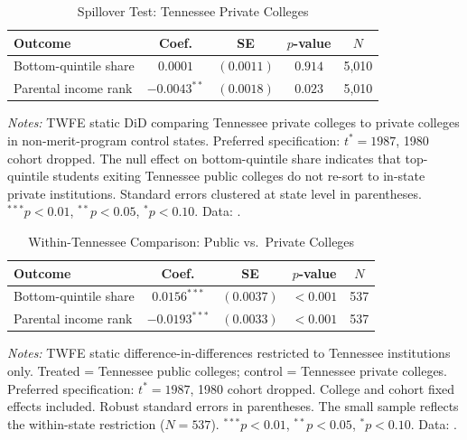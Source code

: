 \begin{table}[H]
\centering
\begin{threeparttable}
\caption{Spillover Test: Tennessee Private Colleges}
\label{tab:spillover}
\begin{tabular}{lcccc}
\toprule
Outcome & Coef. & SE & $p$-value & $N$ \\
\midrule
Bottom-quintile share & $0.0001$ & $(0.0011)$ & $0.914$ & 5,010 \\
Parental income rank & $-0.0043^{**}$ & $(0.0018)$ & $0.023$ & 5,010 \\
\bottomrule
\end{tabular}
\begin{tablenotes}[flushleft]
\footnotesize
\item \textit{Notes:} TWFE static DiD comparing Tennessee private
  colleges to private colleges in non-merit-program control states.
  Preferred specification: $t^* = 1987$, 1980 cohort dropped. The null
  effect on bottom-quintile share indicates that top-quintile students
  exiting Tennessee public colleges do not re-sort to in-state private
  institutions. Standard errors clustered at state level in parentheses.
  $^{***}p<0.01$, $^{**}p<0.05$, $^{*}p<0.10$.
  Data: \textcite{chetty2020mobility}.
\end{tablenotes}
\end{threeparttable}
\end{table}

\begin{table}[H]
\centering
\begin{threeparttable}
\caption{Within-Tennessee Comparison: Public vs.\ Private Colleges}
\label{tab:within_tn}
\begin{tabular}{lcccc}
\toprule
Outcome & Coef. & SE & $p$-value & $N$ \\
\midrule
Bottom-quintile share & $0.0156^{***}$ & $(0.0037)$ & $<0.001$ & 537 \\
Parental income rank & $-0.0193^{***}$ & $(0.0033)$ & $<0.001$ & 537 \\
\bottomrule
\end{tabular}
\begin{tablenotes}[flushleft]
\footnotesize
\item \textit{Notes:} TWFE static difference-in-differences restricted
  to Tennessee institutions only. Treated = Tennessee public colleges;
  control = Tennessee private colleges. Preferred specification:
  $t^* = 1987$, 1980 cohort dropped. College and cohort fixed effects
  included. Robust standard errors in parentheses. The small sample
  reflects the within-state restriction ($N = 537$). $^{***}p<0.01$,
  $^{**}p<0.05$, $^{*}p<0.10$. Data: \textcite{chetty2020mobility}.
\end{tablenotes}
\end{threeparttable}
\end{table}

